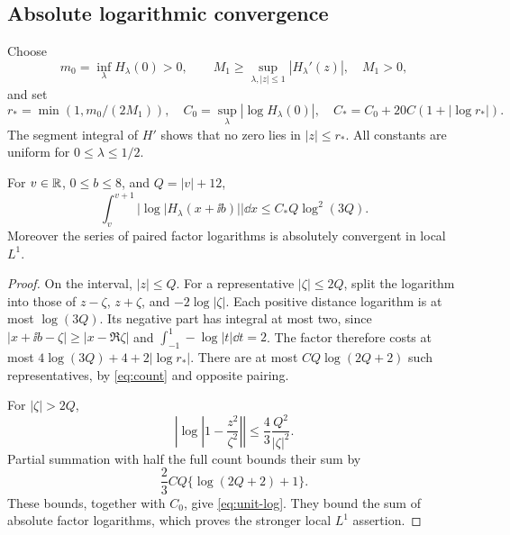 \subsection{Absolute logarithmic convergence}

Choose
\[
 m_0=\inf_\lambda H_\lambda(0)>0,\qquad
 M_1\ge\sup_{\lambda,|z|\le1}|H_\lambda'(z)|,\quad M_1>0,
\]
and set
\[
 r_*=\min(1,m_0/(2M_1)),\quad
 C_0=\sup_\lambda|\log H_\lambda(0)|,\quad
 C_*=C_0+20C(1+|\log r_*|).
\]
The segment integral of \(H'\) shows that no zero lies in
\(|z|\le r_*\). All constants are uniform for \(0\le\lambda\le1/2\).

\begin{lemma}\label{lem:unit-log}
For \(v\in\mathbb R\), \(0\le b\le8\), and \(Q=|v|+12\),
\begin{equation}\label{eq:unit-log}
 \int_v^{v+1}|\log|H_\lambda(x+\ii b)||\dd x
 \le C_*Q\log^2(3Q).
\end{equation}
Moreover the series of paired factor logarithms is absolutely
convergent in local \(L^1\).
\end{lemma}
\begin{proof}
On the interval, \(|z|\le Q\). For a representative \(|\zeta|\le2Q\),
split the logarithm into those of \(z-\zeta\), \(z+\zeta\), and
\(-2\log|\zeta|\). Each positive distance logarithm is at most
\(\log(3Q)\). Its negative part has integral at most two, since
\(|x+\ii b-\zeta|\ge|x-\Re\zeta|\) and
\(\int_{-1}^1-\log|t|\dd t=2\).
The factor therefore costs at most
\(4\log(3Q)+4+2|\log r_*|\).
There are at most \(CQ\log(2Q+2)\) such representatives, by
\eqref{eq:count} and opposite pairing.

For \(|\zeta|>2Q\),
\[
 \left|\log\left|1-\frac{z^2}{\zeta^2}\right|\right|
 \le\frac43\frac{Q^2}{|\zeta|^2}.
\]
Partial summation with half the full count bounds their sum by
\[
 \frac23CQ\{\log(2Q+2)+1\}.
\]
These bounds, together with \(C_0\), give \eqref{eq:unit-log}.
They bound the sum of absolute factor logarithms, which proves the
stronger local \(L^1\) assertion.
\end{proof}

